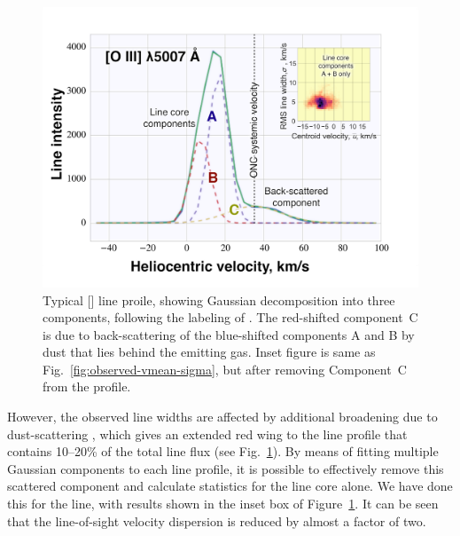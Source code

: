 \documentclass[useAMS,usenatbib]{mn2e}
\begin{document}
\begin{figure}
  \centering
  \includegraphics[width=\linewidth]{ABC-profile-example}
  \caption{Typical [] line proile, showing Gaussian
    decomposition into three components, following the labeling of
    \citet{Castaneda:1988a}.  The red-shifted component~C is due to
    back-scattering of the blue-shifted components A and B by dust
    that lies behind the emitting gas.  Inset figure is same as
    Fig.~\ref{fig:observed-vmean-sigma}, but after removing
    Component~C from the profile.}
  \label{fig:gauss}
\end{figure}

However, the observed line widths are affected by additional
broadening due to dust-scattering \citep{Castaneda:1988a,
  Henney:1998a}, which gives an extended red
wing to the line profile that contains 10--20\% of the total line
flux (see Fig.~\ref{fig:gauss}).   By means of fitting multiple
Gaussian components to each line profile, it is possible to
effectively remove this scattered component and calculate statistics
for the line core alone.  We have done this for the \oiii{} line, with
results shown in the inset box of Figure~\ref{fig:gauss}.  It can be
seen that the line-of-sight velocity dispersion is reduced by almost a
factor of two.  
\end{document}
